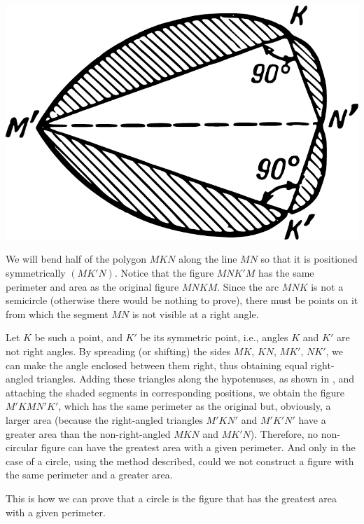 \begin{marginfigure}%
\centering
\includegraphics[width=\textwidth]{figures/ch-12/fig-180.pdf}
\end{marginfigure}

We will bend half of the polygon $MKN$ along the line $MN$ so that it is positioned symmetrically $(MK'N)$. Notice that the figure $MNK'M$ has the same perimeter and area as the original figure $MNKM$. Since the arc $MNK$ is not a semicircle (otherwise there would be nothing to prove), there must be points on it from which the segment $MN$ is not visible at a right angle. 

Let $K$ be such a point, and $K'$ be its symmetric point, i.e., angles $K$ and $K'$ are not right angles. By spreading (or shifting) the sides $MK$, $KN$, $MK'$, $NK'$, we can make the angle enclosed between them right, thus obtaining equal right-angled triangles. Adding these triangles along the hypotenuses, as shown in , and attaching the shaded segments in corresponding positions, we obtain the figure $M'KMN'K'$, which has the same perimeter as the original but, obviously, a larger area (because the right-angled triangles $M'KN'$ and $M'K'N'$ have a greater area than the non-right-angled $MKN$ and $MK'N$). Therefore, no non-circular figure can have the greatest area with a given perimeter. And only in the case of a circle, using the method described, could we not construct a figure with the same perimeter and a greater area.

This is how we can prove that a circle is the figure that has the greatest area with a given perimeter.

